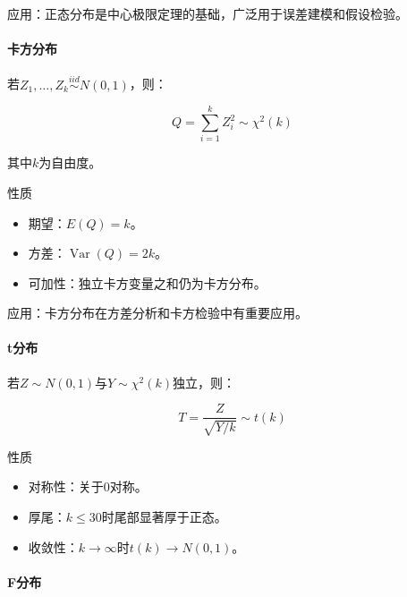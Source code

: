 \begin{flushleft}
应用：正态分布是中心极限定理的基础，广泛用于误差建模和假设检验。
\end{flushleft}
\paragraph*{卡方分布}

\begin{flushleft}
若$Z_1,\dots,Z_k \overset{iid}{\sim} N(0,1)$，则：
\end{flushleft}
\begin{equation}
Q = \sum_{i=1}^k Z_i^2 \sim \chi^2(k)
\end{equation}
\begin{flushleft}
其中$k$为自由度。
\end{flushleft}
\begin{flushleft}
性质
\end{flushleft}
\begin{itemize}
	\item 期望：$E(Q)=k$。
	\item 方差：$\operatorname{Var}(Q)=2k$。
	\item 可加性：独立卡方变量之和仍为卡方分布。
\end{itemize}

\begin{flushleft}
应用：卡方分布在方差分析和卡方检验中有重要应用。
\end{flushleft}
\paragraph*{t分布}

\begin{flushleft}
若$Z \sim N(0,1)$与$Y \sim \chi^2(k)$独立，则：
\end{flushleft}
\begin{equation}
T = \frac{Z}{\sqrt{Y/k}} \sim t(k)
\end{equation}

\begin{flushleft}
性质
\end{flushleft}
\begin{itemize}
	\item 对称性：关于0对称。
	\item 厚尾：$k \leq 30$时尾部显著厚于正态。
	\item 收敛性：$k \to \infty$时$t(k) \to N(0,1)$。
\end{itemize}

\paragraph*{F分布}

